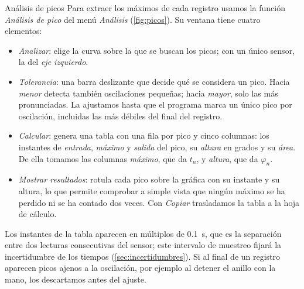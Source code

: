 \documentclass[a4paper,11pt]{amsart}
\makeatletter
\def\subsection{\@startsection{subsection}{2}%
  \z@{.9\linespacing\@plus.6\linespacing}{.3\linespacing}%
  {\normalfont\bfseries\color{azulprof}}}
\numberwithin{equation}{section}
\theoremstyle{cienplano}
\theoremstyle{ciendef}
\theoremstyle{cienobs}
\makeatother
\begin{document}
\subsection{Análisis de picos}\label{sec:picos}
Para extraer los máximos de cada registro usamos la función \emph{Análisis de
pico} del menú \emph{Análisis} (\cref{fig:picos}). Su ventana tiene cuatro
elementos:
\begin{itemize}
  \item \emph{Analizar}: elige la curva sobre la que se buscan los picos; con
        un único sensor, la del \emph{eje izquierdo}.
  \item \emph{Tolerancia}: una barra deslizante que decide qué se considera un
        pico. Hacia \emph{menor} detecta también oscilaciones pequeñas; hacia
        \emph{mayor}, solo las más pronunciadas. La ajustamos hasta que el
        programa marca un único pico por oscilación, incluidas las más débiles
        del final del registro.
  \item \emph{Calcular}: genera una tabla con una fila por pico y cinco
        columnas: los instantes de \emph{entrada}, \emph{máximo} y
        \emph{salida} del pico, su \emph{altura} en grados y su \emph{área}.
        De ella tomamos las columnas \emph{máximo}, que da $t_n$, y
        \emph{altura}, que da $\varphi_n$.
  \item \emph{Mostrar resultados}: rotula cada pico sobre la gráfica con su
        instante y su altura, lo que permite comprobar a simple vista que
        ningún máximo se ha perdido ni se ha contado dos veces. Con
        \emph{Copiar} trasladamos la tabla a la hoja de cálculo.
\end{itemize}
Los instantes de la tabla aparecen en múltiplos de \SI{0,1}{\second}, que es la
separación entre dos lecturas consecutivas del sensor; este intervalo de
muestreo fijará la incertidumbre de los tiempos (\cref{sec:incertidumbres}).
Si al final de un registro aparecen picos ajenos a la oscilación, por ejemplo
al detener el anillo con la mano, los descartamos antes del ajuste.
\end{document}
